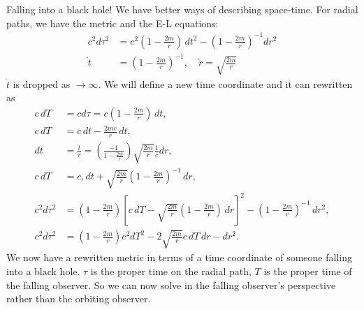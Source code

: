 \documentclass[a4paper, 11pt, normalem]{report}
\begin{document}
\chapter{}
Falling into a black hole!
We have better ways of describing space-time. 
For radial paths, we have the metric and the E-L equations:
\begin{align}
    c^2d\tau^2 &= c^2\left(1-\frac{2m}{r}\right)\,dt^2 - \left(1-\frac{2m}{r}\right)^{-1}dr^2 \\
    \dot{t} &= \left(1-\frac{2m}{r}\right)^{-1},\quad \dot{r} = \sqrt{\frac{2m}{r}}
\end{align}
$\dot{t}$ is dropped as $\to\infty$.
We will define a new time coordinate and it can rewritten as
\begin{align}
    c\,dT &= cd\tau = c\left(1-\frac{2m}{r}\right)\,dt, \\
    c\,dT &= c\,dt - \frac{2mc}{r}\,dt,\\
    dt &= \frac{\dot{t}}{\dot{r}} = \left(\frac{-1}{1-\frac{2m}{r}}\right)\sqrt{\frac{2m}{r}}\frac{1}{c}dr, \\
    c\,dT &= c,dt + \sqrt{\frac{2m}{r}}\left(1-\frac{2m}{r}\right)^{-1}\,dr, \\
    c^2d\tau^2 &= \left(1-\frac{2m}{r}\right)\left[c\,dT - \sqrt{\frac{2m}{r}}\left(1-\frac{2m}{r}\right)\,dr\right]^2 - \left(1-\frac{2m}{r}\right)^{-1}\,dr^2, \\
    c^2d\tau^2 &= \left(1-\frac{2m}{r}\right)c^2dT^2 - 2\sqrt{\frac{2m}{r}}c\,dT\,dr - dr^2.
\end{align}
We now have a rewritten metric in terms of a time coordinate of someone falling into a black hole. 
$\tau$ is the proper time on the radial path, $T$ is the proper time of the falling observer. 
So we can now solve in the falling observer's perspective rather than the orbiting observer.
\end{document}

